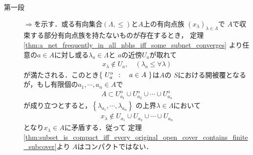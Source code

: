 	\begin{prf}\mbox{}
		\begin{description}
			\item[第一段]
				$\Longrightarrow$を示す．或る有向集合$(\Lambda,\leq)$と$A$上の有向点族
				$(x_\lambda)_{\lambda \in \Lambda}$で
				$A$で収束する部分有向点族を持たないものが存在するとき，
				定理\ref{thm:a_net_frequently_in_all_nbhs_iff_some_subnet_converges}
				より任意の$a \in A$に対し或る$\lambda_a \in \Lambda$と
				$a$の近傍$U_a$が取れて
				\begin{align}
					x_\lambda \notin U_a, \quad (\lambda_a \leq \forall \lambda)
				\end{align}
				が満たされる．このとき$\left\{\ U_a^{\mathrm{o}}\ \, : \quad a \in A\ \right\}$は$A$の
				$S$における開被覆となるが，もし有限個の$a_1,\cdots,a_n \in A$で
				\begin{align}
					A \subset U_{a_1}^{\mathrm{o}} \cup U_{a_2}^{\mathrm{o}}
					\cup \cdots \cup U_{a_n}^{\mathrm{o}}
				\end{align}
				が成り立つとすると，$\left\{\lambda_{a_1},\cdots,\lambda_{a_n}\right\}$
				の上界$\lambda \in \Lambda$において
				\begin{align}
					x_\lambda \notin U_{a_1} \cup U_{a_2} \cup \cdots \cup U_{a_n}
				\end{align}
				となり$x_\lambda \in A$に矛盾する．従って
				定理\ref{thm:subset_is_compact_iff_every_original_open_cover_contains_finite_subcover}より
				$A$はコンパクトではない．
				

\end{description}
\end{prf}
